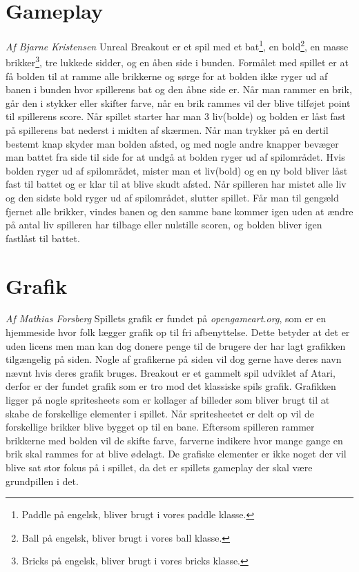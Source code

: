 
\section{Gameplay}
\textit{Af Bjarne Kristensen}\newline
Unreal Breakout er et spil med et bat\footnote{Paddle på engelsk, bliver brugt i vores paddle klasse.}, en bold\footnote{Ball på engelsk, bliver brugt i vores ball klasse.}, en masse brikker\footnote{Bricks på engelsk, bliver brugt i vores bricks klasse.}, tre lukkede sidder, og en åben side i bunden. Formålet med spillet er at få bolden til at ramme alle brikkerne og sørge for at bolden ikke ryger ud af banen i bunden hvor spillerens bat og den åbne side er. Når man rammer en brik, går den i stykker eller skifter farve, når en brik rammes vil der blive tilføjet point til spillerens score. Når spillet starter har man 3 liv(bolde) og bolden er låst fast på spillerens bat nederst i midten af skærmen. Når man trykker på en dertil bestemt knap skyder man bolden afsted, og med nogle andre knapper bevæger man battet fra side til side for at undgå at bolden ryger ud af spilområdet. Hvis bolden ryger ud af spilområdet, mister man et liv(bold) og en ny bold bliver låst fast til battet og er klar til at blive skudt afsted. Når spilleren har mistet alle liv og den sidste bold ryger ud af spilområdet, slutter spillet. Får man til gengæld fjernet alle brikker, vindes banen og den samme bane kommer igen uden at ændre på antal liv spilleren har tilbage eller nulstille scoren, og bolden bliver igen fastlåst til battet.

\section{Grafik} 
\textit{Af Mathias Forsberg}\newline
Spillets grafik er fundet på \textit{opengameart.org}, som er en hjemmeside hvor folk lægger grafik op til fri afbenyttelse. Dette betyder at det er uden licens men man kan dog donere penge til de brugere der har lagt grafikken tilgængelig på siden. Nogle af grafikerne på siden vil dog gerne have deres navn nævnt hvis deres grafik bruges. \newline
Breakout er et gammelt spil udviklet af Atari, derfor er der fundet grafik som er tro mod det klassiske spils grafik. Grafikken ligger på nogle spritesheets som er kollager af billeder som bliver brugt til at skabe de forskellige elementer i spillet. Når spritesheetet er delt op vil de forskellige brikker blive bygget op til en bane. Eftersom spilleren rammer brikkerne med bolden vil de skifte farve, farverne indikere hvor mange gange en brik skal rammes for at blive ødelagt. De grafiske elementer er ikke noget der vil blive sat stor fokus på i spillet, da det er spillets gameplay der skal være grundpillen i det. 

